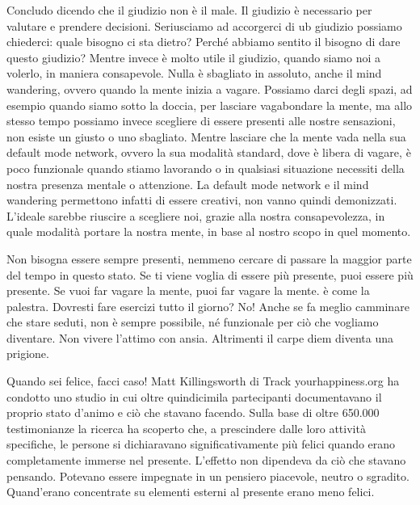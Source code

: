 \documentclass[12pt]{book} %
\begin{document}
Concludo dicendo che il giudizio non è il male. Il giudizio è necessario per valutare e prendere decisioni. Seriusciamo ad accorgerci di ub giudizio possiamo chiederci: quale bisogno ci sta dietro?
Perché abbiamo sentito il bisogno di dare questo giudizio? Mentre invece è molto utile il giudizio, quando siamo noi a
volerlo, in maniera consapevole.
Nulla è sbagliato in assoluto, anche il mind wandering, ovvero quando la mente inizia a vagare. Possiamo darci degli spazi, ad
esempio quando siamo sotto la doccia, per lasciare vagabondare la mente, ma allo stesso tempo possiamo invece scegliere
di essere presenti alle nostre sensazioni, non esiste un giusto o uno sbagliato. Mentre lasciare che la mente vada
nella sua default mode network, ovvero la sua modalità standard, dove è libera di vagare, è poco funzionale quando
stiamo lavorando o in qualsiasi situazione necessiti della nostra presenza mentale o attenzione. 
La default mode network e il mind wandering permettono infatti di essere creativi, non vanno quindi
demonizzati.
L'ideale sarebbe riuscire a scegliere noi, grazie alla nostra consapevolezza, in quale modalità
portare la nostra mente, in base al nostro scopo in quel momento.

Non bisogna essere sempre presenti, nemmeno cercare di passare la maggior parte del tempo in questo stato. Se ti viene
voglia di essere più presente, puoi essere più presente. Se vuoi far vagare la mente, puoi far vagare la mente. è come
la palestra. Dovresti fare esercizi tutto il giorno? No! Anche se fa meglio camminare che stare seduti, non è sempre
possibile, né funzionale per ciò che vogliamo diventare. Non vivere l'attimo con ansia. Altrimenti il carpe diem diventa una prigione.

Quando sei felice, facci caso!
Matt Killingsworth di Track yourhappiness.org ha condotto uno studio in cui oltre quindicimila partecipanti
documentavano il proprio stato d'animo e ciò che stavano facendo. Sulla base di oltre 650.000
testimonianze la ricerca ha scoperto che, a prescindere dalle loro attività specifiche, le persone si dichiaravano
significativamente più felici quando erano completamente immerse nel presente. L'effetto non dipendeva da ciò che stavano pensando. Potevano essere impegnate in un pensiero piacevole, neutro o sgradito.
Quand'erano concentrate su elementi esterni al presente erano meno felici. 
\end{document}
